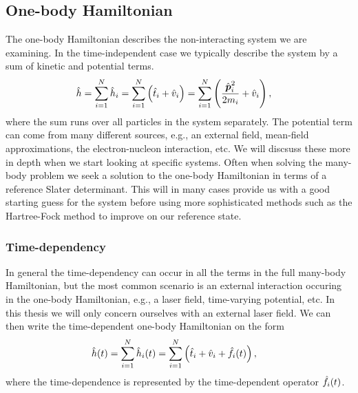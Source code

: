         \subsection{One-body Hamiltonian}
            The one-body Hamiltonian describes the non-interacting system we are
            examining.
            In the time-independent case we typically describe the system by a
            sum of kinetic and potential terms.
            \begin{align}
                \hat{h}
                &= \sum_{i = 1}^{N}\hat{h}_i
                = \sum_{i = 1}^{N}\left( 
                    \hat{t}_i + \hat{v}_i
                 \right)
                = \sum_{i = 1}^{N}\left( 
                    \frac{\hat{\boldsymbol{p}}^2_i}{2m_i} + \hat{v}_i
                 \right),
            \end{align}
            where the sum runs over all particles in the system separately.
            The potential term can come from many different sources, e.g., an
            external field, mean-field approximations, the electron-nucleon
            interaction, etc.
            We will discsuss these more in depth when we start looking at
            specific systems.
            Often when solving the many-body problem we seek a solution to the
            one-body Hamiltonian in terms of a reference Slater determinant.
            This will in many cases provide us with a good starting guess for
            the system before using more sophisticated methods such as the
            Hartree-Fock method to improve on our reference state.

            \subsubsection{Time-dependency}
                In general the time-dependency can occur in all the terms in the
                full many-body Hamiltonian, but the most common scenario is an
                external interaction occuring in the one-body Hamiltonian, e.g.,
                a laser field, time-varying potential, etc.
                In this thesis we will only concern ourselves with an external
                laser field.
                We can then write the time-dependent one-body Hamiltonian on the
                form
                \begin{align}
                    \hat{h}(t)
                    &= \sum_{i = 1}^{N} \hat{h}_i(t)
                    = \sum_{i = 1}^{N}\left( 
                        \hat{t}_i
                        + \hat{v}_i
                        + \hat{f}_i(t)
                     \right),
                \end{align}
                where the time-dependence is represented by the time-dependent
                operator $\hat{f}_i(t)$.


